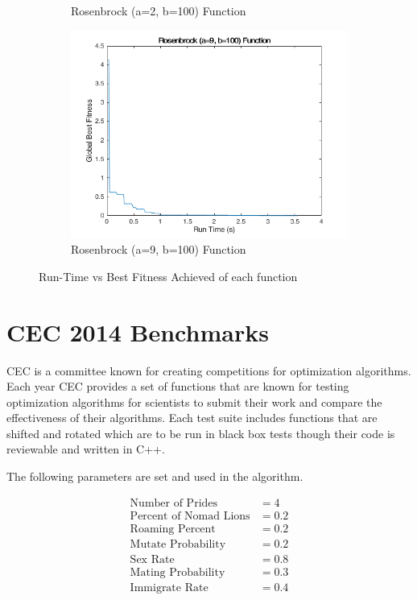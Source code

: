 \begin{figure}
\begin{subfigure}[b]{0.4\textwidth}
    \caption{Rosenbrock (a=2, b=100) Function}
  \end{subfigure}
  \begin{subfigure}[b]{0.4\textwidth}
    \includegraphics[width=\textwidth]{img/summary/rosenbrock9-100}
    \caption{Rosenbrock (a=9, b=100) Function}
  \end{subfigure}
  \caption{Run-Time vs Best Fitness Achieved of each function}
\end{figure}

\clearpage

\section{CEC 2014 Benchmarks}

CEC is a committee known for creating competitions for optimization algorithms. Each year CEC provides a set of functions that are known for testing optimization algorithms for scientists to submit their work and compare the effectiveness of their algorithms. Each test suite includes functions that are shifted and rotated which are to be run in black box tests though their code is reviewable and written in C++.

The following parameters are set and used in the algorithm.

\begin{align*}
\text{Number of Prides} &= 4\\
\text{Percent of Nomad Lions} &= 0.2\\
\text{Roaming Percent} &= 0.2\\
\text{Mutate Probability} &= 0.2\\
\text{Sex Rate} &= 0.8\\
\text{Mating Probability} &= 0.3\\
\text{Immigrate Rate} &= 0.4\\
\end{align*}

